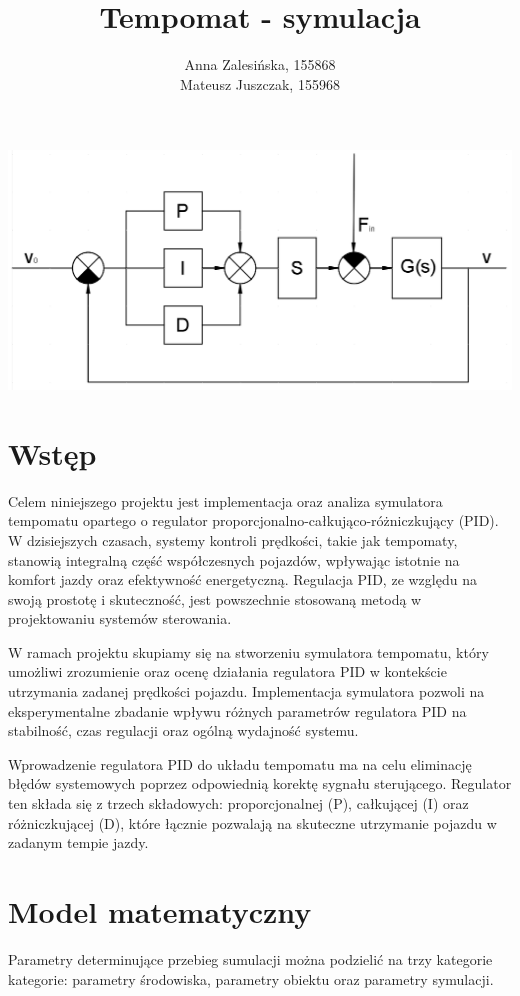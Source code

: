 \documentclass[12pt,a4paper]{article}
\begin{document}
	\title{Tempomat - symulacja}
	\author{Anna Zalesińska, 155868 \\ Mateusz Juszczak, 155968}
	\date{}
	\maketitle
	
	\begin{center}
		\includegraphics[scale=0.45]{"regulator.png"}
	\end{center}
	\section{Wstęp}
	Celem niniejszego projektu jest implementacja oraz analiza symulatora tempomatu opartego o regulator proporcjonalno-całkująco-różniczkujący (PID). W dzisiejszych czasach, systemy kontroli prędkości, takie jak tempomaty, stanowią integralną część współczesnych pojazdów, wpływając istotnie na komfort jazdy oraz efektywność energetyczną. Regulacja PID, ze względu na swoją prostotę i skuteczność, jest powszechnie stosowaną metodą w projektowaniu systemów sterowania.
	
	W ramach projektu skupiamy się na stworzeniu symulatora tempomatu, który umożliwi zrozumienie oraz ocenę działania regulatora PID w kontekście utrzymania zadanej prędkości pojazdu. Implementacja symulatora pozwoli na eksperymentalne zbadanie wpływu różnych parametrów regulatora PID na stabilność, czas regulacji oraz ogólną wydajność systemu.
	
	Wprowadzenie regulatora PID do układu tempomatu ma na celu eliminację błędów systemowych poprzez odpowiednią korektę sygnału sterującego. Regulator ten składa się z trzech składowych: proporcjonalnej (P), całkującej (I) oraz różniczkującej (D), które łącznie pozwalają na skuteczne utrzymanie pojazdu w zadanym tempie jazdy.
	
	\section{Model matematyczny}
	Parametry determinujące przebieg sumulacji można podzielić na trzy kategorie kategorie: parametry środowiska, parametry obiektu oraz parametry symulacji.
	
\end{document}

